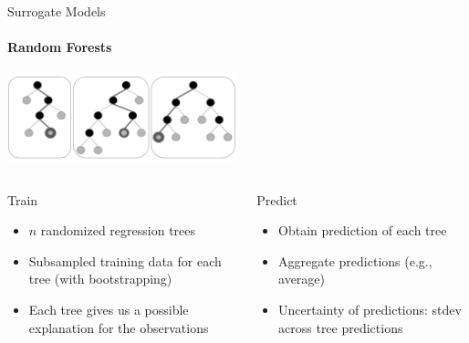 \begin{frame}[c]{Surrogate Models}
\framesubtitle{Random Forests}

\centering
    \includegraphics[width=0.5\textwidth]{images/surrogate_models/random_forest_pic}

\begin{columns}[T] %
\begin{column}{.48\textwidth}

\begin{block}{Train}
\begin{itemize}
	\item $n$ randomized regression trees
	\item Subsampled training data for each tree (with bootstrapping)
	\item Each tree gives us a possible explanation for the observations
\end{itemize}
\end{block}
\end{column}

\pause
\hfill

\begin{column}{.48\textwidth}
    \begin{block}{Predict}
    \begin{itemize}
    	\item Obtain prediction of each tree
    	\item Aggregate predictions (e.g., average)
    	\item Uncertainty of predictions: stdev across tree predictions
    \end{itemize}
    \end{block}
\end{column}
\end{columns}

\end{frame}
